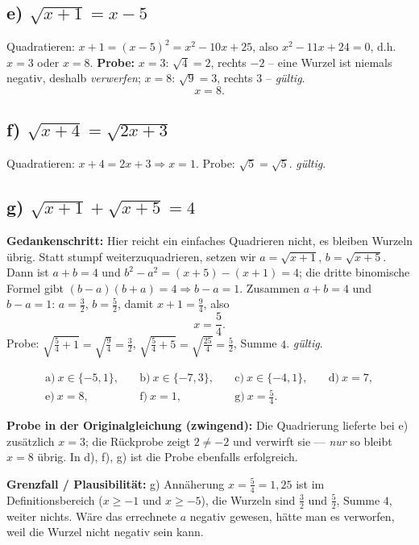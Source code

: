 \subsection*{e) $\sqrt{x+1}=x-5$}
Quadratieren: $x+1=(x-5)^2=x^2-10x+25$, also $x^2-11x+24=0$, d.h.
$x=3$ oder $x=8$. \textbf{Probe:} $x=3$: $\sqrt4=2$, rechts $-2$ --
eine Wurzel ist niemals negativ, deshalb \emph{verwerfen};  $x=8$:
$\sqrt9=3$, rechts $3$ -- \emph{gültig}.
\begin{equation}
  x=8 .
\end{equation}

\subsection*{f) $\sqrt{x+4}=\sqrt{2x+3}$}
Quadratieren: $x+4=2x+3\Rightarrow x=1$. Probe: $\sqrt5=\sqrt5$. \emph{gültig}.

\subsection*{g) $\sqrt{x+1}+\sqrt{x+5}=4$}
\textbf{Gedankenschritt:} Hier reicht ein einfaches Quadrieren nicht, es
bleiben Wurzeln übrig. Statt stumpf weiterzuquadrieren, setzen wir
$a=\sqrt{x+1}$, $b=\sqrt{x+5}$. Dann ist $a+b=4$ und
$b^2-a^2=(x+5)-(x+1)=4$; die dritte binomische Formel gibt
$(b-a)(b+a)=4\Rightarrow b-a=1$. Zusammen $a+b=4$ und $b-a=1$:
$a=\tfrac32$, $b=\tfrac52$, damit $x+1=\tfrac94$, also
\begin{equation}
  x=\frac54 .
\end{equation}
Probe: $\sqrt{\tfrac54+1}=\sqrt{\tfrac94}=\tfrac32$,
$\sqrt{\tfrac54+5}=\sqrt{\tfrac{25}{4}}=\tfrac52$, Summe $4$. \emph{gültig}.

\begin{ergebnis}
\begin{align*}
  \text{a)}\ x\in\{-5,1\}, &\quad
  \text{b)}\ x\in\{-7,3\}, &\quad
  \text{c)}\ x\in\{-4,1\}, &\quad
  \text{d)}\ x=7,\\
  \text{e)}\ x=8, &\quad
  \text{f)}\ x=1, &\quad
  \text{g)}\ x=\tfrac54 .
\end{align*}
\end{ergebnis}

\begin{kontrolle}
\textbf{Probe in der Originalgleichung (zwingend):} Die Quadrierung
lieferte bei e) zusätzlich $x=3$; die Rückprobe zeigt $2\neq-2$ und
verwirft sie --- \emph{nur} so bleibt $x=8$ übrig. In d), f), g) ist die
Probe ebenfalls erfolgreich.

\textbf{Grenzfall / Plausibilität:} g) Annäherung $x=\tfrac54=1{,}25$ ist
im Definitionsbereich ($x\ge-1$ und $x\ge-5$), die Wurzeln sind
$\tfrac32$ und $\tfrac52$, Summe $4$, weiter nichts. Wäre das errechnete
$a$ negativ gewesen, hätte man es verworfen, weil die Wurzel nicht negativ
sein kann.
\end{kontrolle}

